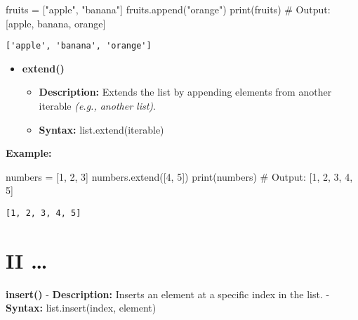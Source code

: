 \documentclass[
  letterpaper,
  DIV=11,
  numbers=noendperiod]{scrreprt}
\newenvironment{Shaded}{\begin{snugshade}}{\end{snugshade}}
\newcommand{\BuiltInTok}[1]{\textcolor[rgb]{0.00,0.23,0.31}{#1}}
\newcommand{\CommentTok}[1]{\textcolor[rgb]{0.37,0.37,0.37}{#1}}
\newcommand{\DecValTok}[1]{\textcolor[rgb]{0.68,0.00,0.00}{#1}}
\newcommand{\NormalTok}[1]{\textcolor[rgb]{0.00,0.23,0.31}{#1}}
\newcommand{\OperatorTok}[1]{\textcolor[rgb]{0.37,0.37,0.37}{#1}}
\newcommand{\StringTok}[1]{\textcolor[rgb]{0.13,0.47,0.30}{#1}}
\providecommand{\tightlist}{%
  \setlength{\itemsep}{0pt}\setlength{\parskip}{0pt}}
\begin{document}
\begin{Shaded}
\begin{Highlighting}[]
\NormalTok{fruits }\OperatorTok{=}\NormalTok{ [}\StringTok{"apple"}\NormalTok{, }\StringTok{"banana"}\NormalTok{]}
\NormalTok{fruits.append(}\StringTok{"orange"}\NormalTok{)}
\BuiltInTok{print}\NormalTok{(fruits)  }\CommentTok{\# Output: [\textquotesingle{}apple\textquotesingle{}, \textquotesingle{}banana\textquotesingle{}, \textquotesingle{}orange\textquotesingle{}]}
\end{Highlighting}
\end{Shaded}

\begin{verbatim}
['apple', 'banana', 'orange']
\end{verbatim}

\begin{itemize}
\tightlist
\item
  \textbf{extend()}

  \begin{itemize}
  \tightlist
  \item
    \textbf{Description:} Extends the list by appending elements from
    another iterable \emph{(e.g., another list)}.
  \item
    \textbf{Syntax:} list.extend(iterable)
  \end{itemize}
\end{itemize}

\textbf{Example:}

\begin{Shaded}
\begin{Highlighting}[]
\NormalTok{numbers }\OperatorTok{=}\NormalTok{ [}\DecValTok{1}\NormalTok{, }\DecValTok{2}\NormalTok{, }\DecValTok{3}\NormalTok{]}
\NormalTok{numbers.extend([}\DecValTok{4}\NormalTok{, }\DecValTok{5}\NormalTok{])}
\BuiltInTok{print}\NormalTok{(numbers)  }\CommentTok{\# Output: [1, 2, 3, 4, 5]}
\end{Highlighting}
\end{Shaded}

\begin{verbatim}
[1, 2, 3, 4, 5]
\end{verbatim}

\section{II \ldots{}}

\textbf{insert()} - \textbf{Description:} Inserts an element at a
specific index in the list. - \textbf{Syntax:} list.insert(index,
element)
\end{document}
